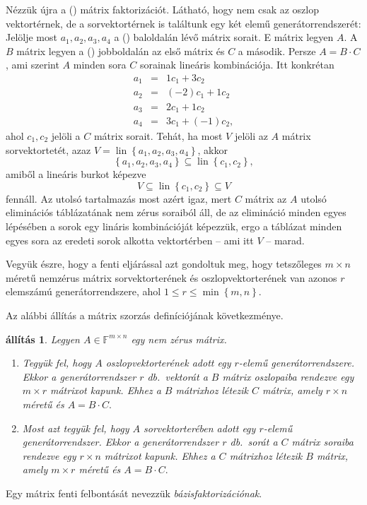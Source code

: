 \documentclass[a4paper, showtrims]{memoir}
\theoremstyle{plain}
\newtheorem{proposition}{állítás}[chapter]
\theoremstyle{remark}
\theoremstyle{definition}
\DeclareMathOperator{\lin}{lin}
\begin{document}
Nézzük újra a (\dag) mátrix faktorizációt.
Látható, hogy nem csak az oszlop vektortérnek, de a sorvektortérnek is találtunk egy két elemű generátorrendszerét:
Jelölje most $a_1,a_2,a_3,a_4$ a (\dag) baloldalán lévő mátrix sorait.
E mátrix legyen $A$.
A $B$ mátrix legyen a (\dag) jobboldalán az első mátrix és $C$ a második.
Persze $A=B\cdot C$, ami szerint $A$ minden sora $C$ sorainak lineáris kombinációja.
Itt konkrétan
\begin{eqnarray*}
    a_1&=& 1c_1+3c_2\\
    a_2&=& (-2)c_1+1c_2\\
    a_3&=& 2c_1+1c_2\\
    a_4&=& 3c_1+(-1)c_2,
\end{eqnarray*}
ahol $c_1,c_2$ jelöli a $C$ mátrix sorait.
Tehát, ha most $V$ jelöli az $A$ mátrix sorvektortetét, azaz
\(V=\lin\left\{ a_1,a_2,a_3,a_4 \right\}\),
akkor 
\[
    \left\{ a_1,a_2,a_3,a_4 \right\}
    \subseteq
    \lin\left\{ c_1,c_2 \right\},
\]
amiből a lineáris burkot képezve
\[
    V\subseteq\lin\left\{ c_1,c_2 \right\}\subseteq V
\]
fennáll. 
Az utolsó tartalmazás most azért igaz, 
mert $C$ mátrix az $A$ utolsó eliminációs táblázatának nem zérus soraiból áll, 
de az elimináció minden egyes lépésében a sorok egy lináris kombinációját képezzük, 
ergo a táblázat minden egyes sora az eredeti sorok alkotta vektortérben -- ami itt $V$ -- marad.

Vegyük észre, hogy a fenti eljárással azt gondoltuk meg, 
hogy tetszőleges $m\times n$ méretű nemzérus mátrix
sorvektorterének és oszlopvektorterének van azonos $r$ elemszámú generátorrendszere,
ahol $1\leq r\leq\min\left\{ m,n \right\}$.

Az alábbi állítás a mátrix szorzás definíciójának következménye.
\begin{proposition}
	Legyen $A\in\mathbb{F}^{m\times n}$ egy nem zérus mátrix.
	\begin{enumerate}
		\item
		      Tegyük fel, hogy $A$ oszlopvektorterének adott egy $r$-elemű generátorrendszere.
		      Ekkor a generátorrendszer $r$ db.~vektorát a $B$ mátrix oszlopaiba rendezve egy $m\times r$ mátrixot kapunk.
		      Ehhez a $B$ mátrixhoz létezik $C$ mátrix, amely $r\times n$ méretű és
		      \(
		      A=B\cdot C.
		      \)
		\item
		      Most azt tegyük fel, hogy $A$ sorvektorterében adott egy $r$-elemű generátorrendszer.
		      Ekkor a generátorrendszer $r$ db.~sorát a $C$ mátrix soraiba rendezve egy $r\times n$ mátrixot kapunk.
		      Ehhez a $C$ mátrixhoz létezik $B$ mátrix, amely $m\times r$ méretű és
		      \(
		      A=B\cdot C.
		      \)
              \qedhere
	\end{enumerate}
\end{proposition}
Egy mátrix fenti felbontását nevezzük \emph{bázisfaktorizációnak}.
\end{document}
